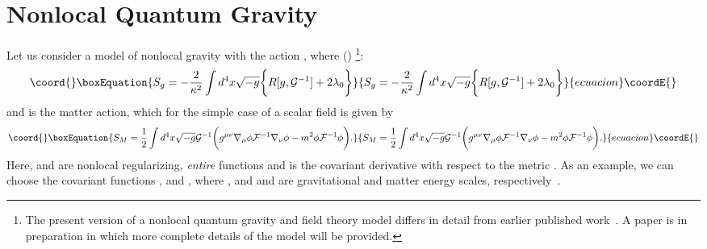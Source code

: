 \documentclass[a4paper,11pt]{article}
\begin{document}
\section{\bf Nonlocal Quantum Gravity}

Let us consider a model of nonlocal gravity with the action
\coordHE{}, where (\coordHE{})
\footnote{The present version of a nonlocal quantum gravity and
field theory model differs in detail from
earlier published work~\cite{Moffat,Moffat2}. A paper is in preparation in which more complete
details of the model will be provided.}:
\begin{equation}\coord{}\boxEquation{
S_g=-\frac{2}{\kappa^2}\int d^4x\sqrt{-g}\biggl\{R[g,{\cal
G}^{-1}]+2\lambda_0\biggr\}
}{
S_g=-\frac{2}{\kappa^2}\int d^4x\sqrt{-g}\biggl\{R[g,{\cal
G}^{-1}]+2\lambda_0\biggr\}
}{ecuacion}\coordE{}\end{equation}
and \coordHE{} is the matter action, which for the simple case of
a scalar field \myHighlight{$\phi$}\coordHE{} is given by
\begin{equation}\coord{}\boxEquation{
S_M=\frac{1}{2}\int d^4x\sqrt{-g}{\cal
G}^{-1}\biggl(g^{\mu\nu}\nabla_\mu\phi{\cal F}^{-1}\nabla_\nu\phi
-m^2\phi{\cal F}^{-1}\phi\biggr).
}{
S_M=\frac{1}{2}\int d^4x\sqrt{-g}{\cal
G}^{-1}\biggl(g^{\mu\nu}\nabla_\mu\phi{\cal F}^{-1}\nabla_\nu\phi
-m^2\phi{\cal F}^{-1}\phi\biggr).
}{ecuacion}\coordE{}\end{equation}
Here, \coordHE{} and \coordHE{} are nonlocal regularizing,
{\it entire} functions and \myHighlight{$\nabla_\mu$}\coordHE{} is the covariant
derivative with respect to the metric \coordHE{}. As an example,
we can choose the covariant
functions
\coordHE{},
and
\coordHE{},
where \coordHE{}, and \coordHE{} and
\coordHE{} are gravitational and matter energy scales,
respectively~\cite{Moffat,Moffat2}.
\end{document}
